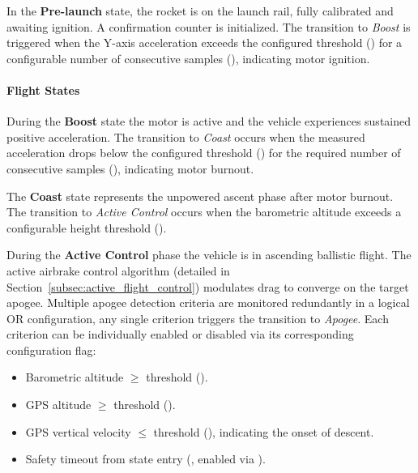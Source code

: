 In the \textbf{Pre-launch} state, the rocket is on the launch rail, fully calibrated and awaiting ignition. A confirmation counter is initialized. The transition to \emph{Boost} is triggered when the Y-axis acceleration exceeds the configured threshold () for a configurable number of consecutive samples (), indicating motor ignition.

\paragraph{Flight States}

During the \textbf{Boost} state the motor is active and the vehicle experiences sustained positive acceleration. The transition to \emph{Coast} occurs when the measured acceleration drops below the configured threshold () for the required number of consecutive samples (), indicating motor burnout.

The \textbf{Coast} state represents the unpowered ascent phase after motor burnout. The transition to \emph{Active Control} occurs when the barometric altitude exceeds a configurable height threshold ().

During the \textbf{Active Control} phase the vehicle is in ascending ballistic flight. The active airbrake control algorithm (detailed in Section~\ref{subsec:active_flight_control}) modulates drag to converge on the target apogee. Multiple apogee detection criteria are monitored redundantly in a logical OR configuration, any single criterion triggers the transition to \emph{Apogee}. Each criterion can be individually enabled or disabled via its corresponding configuration flag:
\begin{itemize}
    \item Barometric altitude $\geq$ threshold ().
    \item GPS altitude $\geq$ threshold ().
    \item GPS vertical velocity $\leq$ threshold (), indicating the onset of descent.
    \item Safety timeout from state entry (, enabled via ).
\end{itemize}

